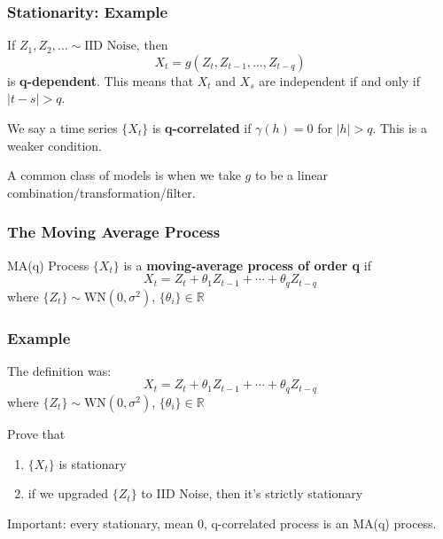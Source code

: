 \documentclass{beamer}
\begin{document}

\begin{frame}
\frametitle{Stationarity: Example}

If $Z_1, Z_2, \ldots \sim \text{IID Noise}$, then 
\[
X_t = g(Z_t, Z_{t-1},\ldots, Z_{t-q})
\]
is {\bf q-dependent}. This means that $X_t$ and $X_s$ are independent if and only if $|t-s| > q$.
\newline

We say a time series $\{X_t\}$ is {\bf q-correlated} if $\gamma(h) = 0$ for $|h| > q$. This is a weaker condition.
\newline

A common class of models is when we take $g$ to be a linear combination/transformation/filter.


\end{frame}



\begin{frame}
\frametitle{The Moving Average Process}

\begin{block}{MA(q) Process}
$\{X_t\}$ is a {\bf moving-average process of order q} if 
\[
X_t = Z_t + \theta_1 Z_{t-1} + \cdots + \theta_q Z_{t-q}
\]
where $\{Z_t\} \sim \text{WN}(0,\sigma^2)$, $\{\theta_i\} \in \mathbb{R}$
\end{block}



\end{frame}


\begin{frame}
\frametitle{Example}

The definition was:
\[
X_t = Z_t + \theta_1 Z_{t-1} + \cdots + \theta_q Z_{t-q}
\]
where $\{Z_t\} \sim \text{WN}(0,\sigma^2)$, $\{\theta_i\} \in \mathbb{R}$
\newline

Prove that 
\begin{enumerate}
\item $\{X_t\}$ is stationary
\item if we upgraded $\{Z_t\}$ to IID Noise, then it's strictly stationary
\end{enumerate}

Important: every stationary, mean $0$, q-correlated process is an MA(q) process.

\end{frame}
\end{document}
